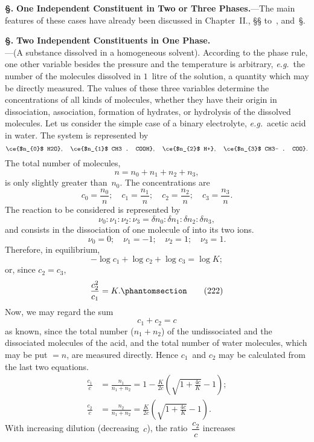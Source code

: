 \documentclass[12pt]{book}[2005/09/16]
\newcommand{\Chg}[2]{#2}
\newcommand{\Add}[1]{\Chg{}{#1}}
\newcommand{\Section}[1]{
  \medskip\par\textbf{§\;#1}
  \label{section:#1}
}
\newcommand{\SecNum}[1]{\hyperref[section:#1.]{{\upshape #1}}}
\newcommand{\SecRef}[2][§\;]{\hyperref[section:#2.]{{\upshape #1#2}}}
\newcommand{\SSecRef}[1]{\SecRef[§§\;]{#1}}
\newcommand{\Tag}[1]{%
  \phantomsection\label{eqn:#1}\tag*{\ensuremath{#1}}%
}
\newcommand{\PageSep}[1]{\ignorespaces}
\newcommand{\Topic}[1]{\textbf{#1}}
\newcommand{\eg}{\emph{e.g.}}
\begin{document}
\Section{261.} \Topic{One Independent Constituent in Two or
Three Phases.}---The main features of these cases have
already been discussed in Chapter~II., \SSecRef{205} to~\SecNum{207}, and~\SecRef{213}.

\Section{262.} \Topic{Two Independent Constituents in One Phase\Add{.}}\\
---(A substance dissolved in a homogeneous solvent).
According to the phase rule, one other variable besides the
pressure and the temperature is arbitrary, \eg\ the number
of the molecules dissolved in $1$~litre of the solution, a
quantity which may be directly measured. The values of
\PageSep{237}
these three variables determine the concentrations of all
kinds of molecules, whether they have their origin in dissociation,
association, formation of hydrates, or hydrolysis
of the dissolved molecules. Let us consider the simple
case of a binary electrolyte, \eg\ acetic acid in water. The
%
%
%
system is represented by
\[
\ce{$n_{0}$ H2O},\quad
\ce{$n_{1}$ CH3 . COOH},\quad
\ce{$n_{2}$ H+},\quad
\ce{$n_{3}$ CH3- . COO}.
\]
The total number of molecules,
\[
n = n_{0} + n_{1} + n_{2} + n_{3},
\]
is only slightly greater than~$n_{0}$. The concentrations are
\[
c_{0} = \frac{n_{0}}{n};\quad
c_{1} = \frac{n_{1}}{n};\quad
c_{2} = \frac{n_{2}}{n};\quad
c_{3} = \frac{n_{3}}{n}.
\]
The reaction to be considered is represented by
\[
\nu_{0} : \nu_{1} : \nu_{2} : \nu_{3}
  = \delta n_{0} : \delta n_{1} : \delta n_{2} : \delta n_{3},
\]
and consists in the dissociation of one molecule of 
into its two ions.
\[
\nu_{0} = 0;\quad
\nu_{1} = -1;\quad
\nu_{2} = 1;\quad
\nu_{3} = 1.
\]
Therefore, in equilibrium,
\[
-\log c_{1} + \log c_{2} + \log c_{3} = \log K;
\]
or, since $c_{2} = c_{3}$,
\[
\frac{c_{2}^{2}}{c_{1}} = K\Add{.}
\Tag{(222)}
\]
Now, we may regard the sum
\[
c_{1} + c_{2} = c
\]
as known, since the total number ($n_{1} + n_{2}$) of the undissociated
and the dissociated molecules of the acid, and the total
number of water molecules, which may be put $= n$, are
\PageSep{238}
measured directly. Hence $c_{1}$~and $c_{2}$ may be calculated from
the last two equations.
\begin{align*}
\frac{c_{1}}{c} &= \frac{n_{1}}{n_{1} + n_{2}}
  = 1 - \frac{K}{2c} \left(\sqrt{1 + \frac{4c}{K}} - 1\right); \\
\frac{c_{2}}{c} &= \frac{n_{2}}{n_{1} + n_{2}}
  = \frac{K}{2c} \left(\sqrt{1 + \frac{4c}{K}} - 1\right).
\end{align*}
With increasing dilution (decreasing~$c$), the ratio~$\dfrac{c_{2}}{c}$ increases
\end{document}
